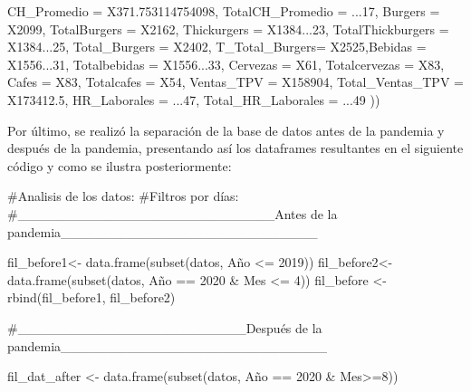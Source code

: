 \documentclass[
  us-letterpaper,
]{scrreprt}
\newenvironment{Shaded}{\begin{snugshade}}{\end{snugshade}}
\newcommand{\AttributeTok}[1]{\textcolor[rgb]{0.40,0.45,0.13}{#1}}
\newcommand{\CommentTok}[1]{\textcolor[rgb]{0.37,0.37,0.37}{#1}}
\newcommand{\DecValTok}[1]{\textcolor[rgb]{0.68,0.00,0.00}{#1}}
\newcommand{\FloatTok}[1]{\textcolor[rgb]{0.68,0.00,0.00}{#1}}
\newcommand{\FunctionTok}[1]{\textcolor[rgb]{0.28,0.35,0.67}{#1}}
\newcommand{\NormalTok}[1]{\textcolor[rgb]{0.00,0.23,0.31}{#1}}
\newcommand{\OtherTok}[1]{\textcolor[rgb]{0.00,0.23,0.31}{#1}}
\newcommand{\SpecialCharTok}[1]{\textcolor[rgb]{0.37,0.37,0.37}{#1}}
\theoremstyle{plain}
\theoremstyle{plain}
\theoremstyle{definition}
\theoremstyle{remark}
\begin{document}
\begin{Shaded}
\begin{Highlighting}[]
                  \AttributeTok{CH\_Promedio =}\NormalTok{ X371}\FloatTok{.753114754098}\NormalTok{, }
                  \AttributeTok{TotalCH\_Promedio =}\NormalTok{ ...}\DecValTok{17}\NormalTok{, }\AttributeTok{Burgers =}\NormalTok{ X2099,}
                  \AttributeTok{TotalBurgers =}\NormalTok{ X2162, }
                  \AttributeTok{Thickurgers =}\NormalTok{ X1384...}\DecValTok{23}\NormalTok{, }
                  \AttributeTok{TotalThickburgers =}\NormalTok{ X1384...}\DecValTok{25}\NormalTok{,}
                  \AttributeTok{Total\_Burgers =}\NormalTok{ X2402, }
                  \AttributeTok{T\_Total\_Burgers=}\NormalTok{ X2525,}\AttributeTok{Bebidas =}\NormalTok{ X1556...}\DecValTok{31}\NormalTok{,}
                  \AttributeTok{Totalbebidas =}\NormalTok{ X1556...}\DecValTok{33}\NormalTok{, }\AttributeTok{Cervezas =}\NormalTok{ X61,}
                  \AttributeTok{Totalcervezas =}\NormalTok{ X83, }\AttributeTok{Cafes =}\NormalTok{ X83,}
                  \AttributeTok{Totalcafes =}\NormalTok{ X54, }\AttributeTok{Ventas\_TPV =}\NormalTok{ X158904,}
                  \AttributeTok{Total\_Ventas\_TPV =}\NormalTok{ X173412}\FloatTok{.5}\NormalTok{,}
                  \AttributeTok{HR\_Laborales =}\NormalTok{ ...}\DecValTok{47}\NormalTok{,}
                  \AttributeTok{Total\_HR\_Laborales =}\NormalTok{ ...}\DecValTok{49}\NormalTok{ ))}
\end{Highlighting}
\end{Shaded}

Por último, se realizó la separación de la base de datos antes de la
pandemia y después de la pandemia, presentando así los dataframes
resultantes en el siguiente código y como se ilustra posteriormente:

\begin{Shaded}
\begin{Highlighting}[]
\CommentTok{\#Analisis de los datos:}
\CommentTok{\#Filtros por días:}
\CommentTok{\#\_\_\_\_\_\_\_\_\_\_\_\_\_\_\_\_\_\_\_\_\_\_\_\_\_\_\_Antes de la pandemia\_\_\_\_\_\_\_\_\_\_\_\_\_\_\_\_\_\_\_\_\_\_\_\_\_\_\_}

\NormalTok{fil\_before1}\OtherTok{\textless{}{-}} \FunctionTok{data.frame}\NormalTok{(}\FunctionTok{subset}\NormalTok{(datos, Año }\SpecialCharTok{\textless{}=} \DecValTok{2019}\NormalTok{))}
\NormalTok{fil\_before2}\OtherTok{\textless{}{-}} \FunctionTok{data.frame}\NormalTok{(}\FunctionTok{subset}\NormalTok{(datos, Año }\SpecialCharTok{==} \DecValTok{2020} \SpecialCharTok{\&}\NormalTok{ Mes }\SpecialCharTok{\textless{}=} \DecValTok{4}\NormalTok{))}
\NormalTok{fil\_before }\OtherTok{\textless{}{-}} \FunctionTok{rbind}\NormalTok{(fil\_before1, fil\_before2)}

\CommentTok{\#\_\_\_\_\_\_\_\_\_\_\_\_\_\_\_\_\_\_\_\_\_\_\_\_Después de la pandemia\_\_\_\_\_\_\_\_\_\_\_\_\_\_\_\_\_\_\_\_\_\_\_\_\_\_\_\_}

\NormalTok{fil\_dat\_after }\OtherTok{\textless{}{-}} \FunctionTok{data.frame}\NormalTok{(}\FunctionTok{subset}\NormalTok{(datos, Año }\SpecialCharTok{==} \DecValTok{2020} \SpecialCharTok{\&}\NormalTok{ Mes}\SpecialCharTok{\textgreater{}=}\DecValTok{8}\NormalTok{))}
\end{Highlighting}
\end{Shaded}
\end{document}
